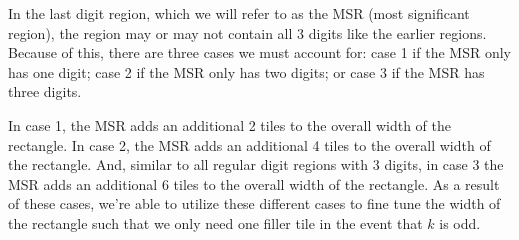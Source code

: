 In the last digit region, which we will refer to as the MSR (most significant region), the region may or may not contain all 3 digits like the earlier regions.
%
Because of this, there are three cases we must account for: case 1 if the MSR only has one digit; case 2 if the MSR only has two digits; or case 3 if the MSR has three digits.
%

%
In case 1, the MSR adds an additional 2 tiles to the overall width of the rectangle.
%
In case 2, the MSR adds an additional 4 tiles to the overall width of the rectangle.
%
And, similar to all regular digit regions with 3 digits, in case 3 the MSR adds an additional 6 tiles to the overall width of the rectangle.
%
As a result of these cases, we're able to utilize these different cases to fine tune the width of the rectangle such that we only need one filler tile in the event that $k$ is odd.
%


